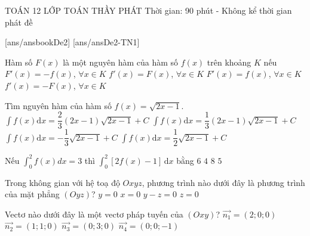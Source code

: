 \begin{name}
	{\tenchude}
	{TOÁN 12}
	{LỚP TOÁN THẦY PHÁT}
	{Thời gian: 90 phút - Không kể thời gian phát đề}
\end{name}
[ans/ansbookDe2]
\TN
{}[ans/ansDe2-TN1]
\begin{ex}%
Hàm số $F(x)$ là một nguyên hàm của hàm số $f(x)$ trên khoảng $K$ nếu
\choice
{$F'(x)=-f(x)$, $\forall x\in K$}
{$f'(x)=F(x)$, $\forall x\in K$}
{\True $F'(x)=f(x)$, $\forall x \in K$}
{$f'(x)=-F(x)$, $\forall x\in K$}
\end{ex}

\begin{ex}%
Tìm nguyên hàm của hàm số $f(x)=\sqrt {2x-1}$.
\choice
{ $\displaystyle\int{f(x)\mathrm{d}x=\dfrac{2}{3}( 2x-1 )\sqrt {2x-1}+C}$}
{\True $\displaystyle\int{f(x)\mathrm{d}x=\dfrac{1}{3}( 2x-1 )\sqrt {2x-1}+C}$}
{ $\displaystyle\int{f(x)\mathrm{d}x=-\dfrac{1}{3}\sqrt {2x-1}+C}$}
{$\displaystyle\int{f(x)\mathrm{d}x=\dfrac{1}{2}\sqrt {2x-1}+C}$}
\end{ex}

\begin{ex}%
Nếu $\displaystyle\int_0^2 f(x) d x=3$ thì $\displaystyle\int_0^2\left[2f(x)-1\right]\mathrm{\,d}x$ bằng
\choice
{$6$}
{\True $4$}
{$8$}
{$5$}
\end{ex}

\begin{ex}%
Trong không gian với hệ toạ độ $Oxyz$, phương trình nào dưới đây là phương trình của mặt phẳng $(Oyz)$?
\choice
{$y=0$}
{\True $x=0$}
{$y-z=0$}
{$z=0$}
\end{ex}

\begin{ex}%
Vectơ nào dưới đây là một vectơ pháp tuyến của $(Oxy)$?
\choice
{$\vec{n_1}=(2;0;0)$}
{$\vec{n_2}=(1;1;0)$}
{$\vec{n_3}=(0;3;0)$}
{\True $\vec{n_4}=(0;0;-1)$}
\end{ex}

